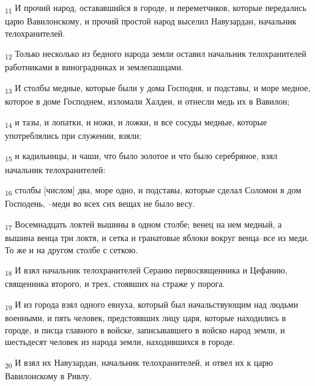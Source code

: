 \begin{tcolorbox}
\textsubscript{11} И прочий народ, остававшийся в городе, и переметчиков, которые передались царю Вавилонскому, и прочий простой народ выселил Навузардан, начальник телохранителей.
\end{tcolorbox}
\begin{tcolorbox}
\textsubscript{12} Только несколько из бедного народа земли оставил начальник телохранителей работниками в виноградниках и землепашцами.
\end{tcolorbox}
\begin{tcolorbox}
\textsubscript{13} И столбы медные, которые были у дома Господня, и подставы, и море медное, которое в доме Господнем, изломали Халдеи, и отнесли медь их в Вавилон;
\end{tcolorbox}
\begin{tcolorbox}
\textsubscript{14} и тазы, и лопатки, и ножи, и ложки, и все сосуды медные, которые употреблялись при служении, взяли;
\end{tcolorbox}
\begin{tcolorbox}
\textsubscript{15} и кадильницы, и чаши, что было золотое и что было серебряное, взял начальник телохранителей:
\end{tcolorbox}
\begin{tcolorbox}
\textsubscript{16} столбы [числом] два, море одно, и подставы, которые сделал Соломон в дом Господень, --меди во всех сих вещах не было весу.
\end{tcolorbox}
\begin{tcolorbox}
\textsubscript{17} Восемнадцать локтей вышины в одном столбе; венец на нем медный, а вышина венца три локтя, и сетка и гранатовые яблоки вокруг венца--все из меди. То же и на другом столбе с сеткою.
\end{tcolorbox}
\begin{tcolorbox}
\textsubscript{18} И взял начальник телохранителей Сераию первосвященника и Цефанию, священника второго, и трех, стоявших на страже у порога.
\end{tcolorbox}
\begin{tcolorbox}
\textsubscript{19} И из города взял одного евнуха, который был начальствующим над людьми военными, и пять человек, предстоявших лицу царя, которые находились в городе, и писца главного в войске, записывавшего в войско народ земли, и шестьдесят человек из народа земли, находившихся в городе.
\end{tcolorbox}
\begin{tcolorbox}
\textsubscript{20} И взял их Навузардан, начальник телохранителей, и отвел их к царю Вавилонскому в Ривлу.
\end{tcolorbox}
